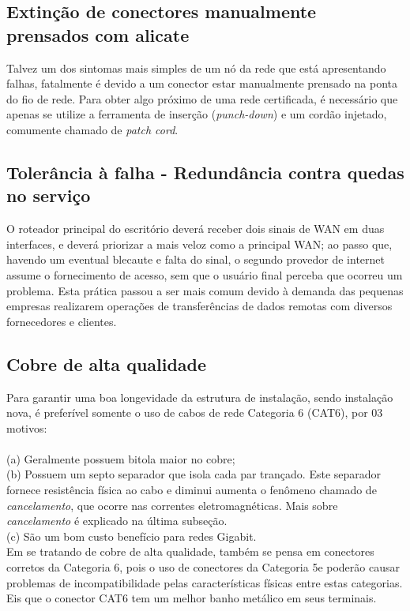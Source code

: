 \documentclass[	DIV=calc,%
							paper=a4,%
							fontsize=12pt,%
							onecolumn]{scrartcl}	 					%
\begin{document}
\subsection{Extinção de conectores manualmente prensados com alicate}
Talvez um dos sintomas mais simples de um nó da rede que está apresentando falhas, fatalmente é devido a um conector estar manualmente prensado na ponta do fio de rede. Para obter algo próximo de uma rede certificada, é necessário que apenas se utilize a ferramenta de inserção (\textit{punch-down}) e um cordão injetado, comumente chamado de \textit{patch cord}.

\subsection{Tolerância à falha - Redundância contra quedas no serviço}
O roteador principal do escritório deverá receber dois sinais de WAN em duas interfaces, e deverá priorizar a mais veloz como a principal WAN; ao passo que, havendo um eventual blecaute e falta do sinal, o segundo provedor de internet assume o fornecimento de acesso, sem que o usuário final perceba que ocorreu um problema. Esta prática passou a ser mais comum devido à demanda das pequenas empresas realizarem operações de transferências de dados remotas com diversos fornecedores e clientes.

\subsection{Cobre de alta qualidade}
Para garantir uma boa longevidade da estrutura de instalação, sendo instalação nova, é preferível somente o uso de cabos de rede Categoria 6 (CAT6), por 03 motivos: \\ \\
(a) Geralmente possuem bitola maior no cobre;\\
(b) Possuem um septo separador que isola cada par trançado. Este separador fornece resistência física ao cabo e diminui aumenta o fenômeno chamado de \textit{cancelamento}, que ocorre nas correntes eletromagnéticas. Mais sobre \textit{cancelamento} é explicado na última subseção.\\
(c) São um bom custo benefício para redes Gigabit.\\

Em se tratando de cobre de alta qualidade, também se pensa em conectores corretos da Categoria 6, pois o uso de conectores da Categoria 5e poderão causar problemas de incompatibilidade pelas características físicas entre estas categorias. Eis que o conector CAT6 tem um melhor banho metálico em seus terminais.
\end{document}
